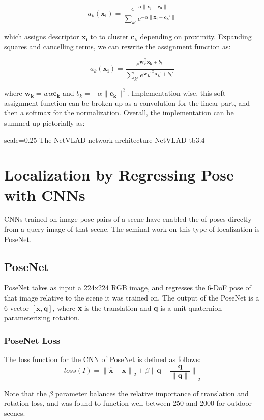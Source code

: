 \[a_k(\mathbf{x_i}) = \frac{e^{-\alpha\|\mathbf{x_i - c_k}\|}}{\sum_{k'}e^{-\alpha\|\mathbf{x_i - c_k'}\|}}\]

which assigns descriptor $\mathbf{x_i}$ to to cluster $\mathbf{c_k}$ depending on proximity. Expanding squares and cancelling terms, we can rewrite the assignment
function as:

\[a_k(\mathbf{x_i}) = \frac{e^{\mathbf{w_k^T x_k} + b_k}}{\sum_{k'}e^{\mathbf{w_k'^T x_k'} + b_k'}}\]

where $\mathbf{w_k} = w\alpha\mathbf{c_k}$ and $b_k = -\alpha\|\mathbf{c_k}\|^2$. Implementation-wise, this soft-assignment function can be broken up as a convolution
for the linear part, and then a softmax for the normalization. Overall, the implementation can be summed up pictorially as:

{scale=0.25}%
{The NetVLAD network architecture}%
{NetVLAD}%
{tb3.4} %

\section{Localization by Regressing Pose with CNNs}
CNNs trained on image-pose pairs of a scene have enabled the  of poses directly from a query image of that scene. The seminal work on this type of localization is PoseNet.

\subsection{PoseNet}
PoseNet takes as input a 224x224 RGB image, and regresses the 6-DoF pose of that image relative to the scene it was trained on. The output of the PoseNet is a 6 vector $[\mathbf{x}, \mathbf{q}]$, where \textbf{x} is the translation and \textbf{q} is a unit quaternion parameterizing rotation. 

\subsubsection{PoseNet Loss}
The loss function for the CNN of PoseNet is defined as follows:
\[loss(I) = \mathbf{\|\hat{x} - x\|}_2 + \beta\mathbf{\|q - \dfrac{q}{\|q\|}\|}_2\]

Note that the $\beta$ parameter balances the relative importance of translation and rotation loss, and was found to function well between 250 and 2000 for outdoor scenes.

